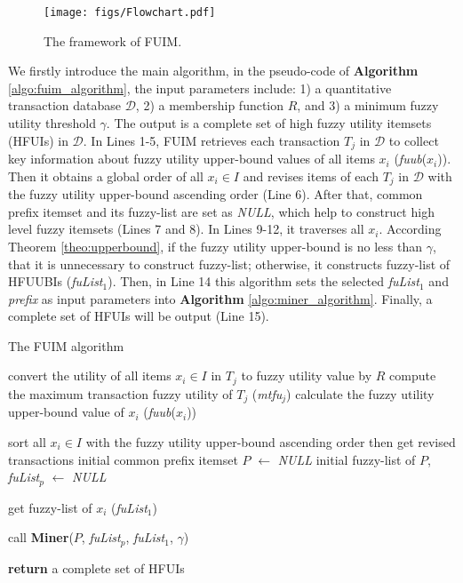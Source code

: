 \documentclass[journal]{IEEEtran}
\begin{document}
\begin{figure}[hbtp]
	\centering
	\texttt{[image: figs/Flowchart.pdf]}
	\caption{The framework of FUIM.}
	\label{fig:flowchart}
\end{figure}


We firstly introduce the main algorithm, in the pseudo-code of \textbf{Algorithm} \ref{algo:fuim_algorithm}, the input parameters include: 1) a quantitative transaction database $\mathcal{D}$, 2) a membership function $R$, and 3) a minimum fuzzy utility threshold $\gamma$. The output is a complete set of high fuzzy utility itemsets (HFUIs) in $\mathcal{D}$. In Lines 1-5, FUIM retrieves each transaction $T_j$ in $\mathcal{D}$ to collect key information about fuzzy utility upper-bound values of all items $x_i$ (\textit{fuub}($x_i$)). Then it obtains a global order of all $x_i \in I$ and revises items of each $T_j$ in $\mathcal{D}$ with the fuzzy utility upper-bound ascending order (Line 6). After that, common prefix itemset and its fuzzy-list are set as \textit{NULL}, which help to construct high level fuzzy itemsets (Lines 7 and 8). In Lines 9-12, it traverses all $x_i$. According Theorem \ref{theo:upperbound}, if the fuzzy utility upper-bound is no less than $\gamma$, that it is unnecessary to construct fuzzy-list; otherwise, it constructs fuzzy-list of HFUUBIs (\textit{fuList}$_1$). Then, in Line 14 this algorithm sets the selected \textit{fuList}$_1$ and \textit{prefix} as input parameters into \textbf{Algorithm} \ref{algo:miner_algorithm}. Finally, a complete set of HFUIs will be output (Line 15).


\begin{algorithm}[h]
	\caption{The FUIM algorithm}
	\label{algo:fuim_algorithm}
	\LinesNumbered
	
	 {
		convert the utility of all items $x_i \in I$ in $T_j$ to fuzzy utility value by $R$\;
		compute the maximum transaction fuzzy utility of $T_j$ (\textit{mtfu}$_j$)\;
		calculate the fuzzy utility upper-bound value of $x_i$ (\textit{fuub}($x_i$))\;
	}
	
	sort all $x_i \in I$ with the fuzzy utility upper-bound ascending order then get revised transactions\;
	initial common prefix itemset $P$ $\leftarrow$ \textit{NULL}\;
	initial fuzzy-list of $P$, \textit{fuList}$_{p}$ $\leftarrow$ \textit{NULL}\;
	
	 {
		 {
			get fuzzy-list of $x_i$ (\textit{fuList}$_1$)\;
		}
	}
	
	call \textbf{Miner}($P$, \textit{fuList}$_{p}$, \textit{fuList}$_1$, $\gamma$)\;
	
	\textbf{return} a complete set of HFUIs
\end{algorithm}
\end{document}
